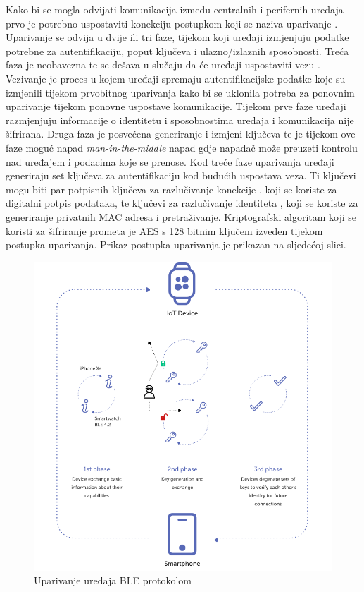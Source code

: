\documentclass[times, utf8, diplomski]{fer}
\begin{document}
Kako bi se mogla odvijati komunikacija između centralnih i perifernih uređaja prvo je potrebno uspostaviti konekciju postupkom koji se naziva uparivanje . Uparivanje se odvija u dvije ili tri faze, tijekom koji uređaji izmjenjuju podatke potrebne za autentifikaciju, poput ključeva i ulazno/izlaznih sposobnosti. Treća faza je neobavezna te se dešava u slučaju da će uređaji uspostaviti vezu . Vezivanje  je proces u kojem uređaji spremaju autentifikacijske podatke koje su izmjenili tijekom prvobitnog uparivanja kako bi se uklonila potreba za ponovnim uparivanje tijekom ponovne uspostave komunikacije. Tijekom prve faze uređaji razmjenjuju informacije o identitetu i sposobnostima uređaja i komunikacija nije šifrirana. Druga faza je posvećena generiranje i izmjeni ključeva te je tijekom ove faze moguć napad \emph{man-in-the-middle} napad gdje napadač može preuzeti kontrolu nad uređajem i podacima koje se prenose. Kod treće faze uparivanja uređaji generiraju set ključeva za autentifikaciju kod budućih uspostava veza. Ti ključevi mogu biti par potpisnih ključeva za razlučivanje konekcije , koji se koriste za digitalni potpis podataka, te ključevi za razlučivanje identiteta , koji se koriste za generiranje privatnih MAC adresa i pretraživanje. Kriptografski algoritam koji se koristi za šifriranje prometa je AES  s 128 bitnim ključem izveden tijekom postupka uparivanja. Prikaz postupka uparivanja je prikazan na sljedećoj slici.
\begin{figure}[H]
    \centering
    \includegraphics[width=13cm]{images/ble.png}
    \caption{Uparivanje uređaja BLE protokolom\citep{Kacherovska2019Aug}}
    \label{fig:ble}
\end{figure}
\end{document}
